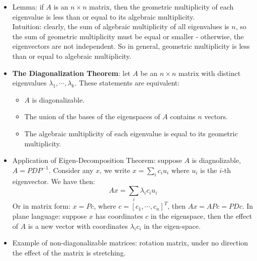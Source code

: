 \documentclass{report}
\begin{document}
\begin{itemize}
	\item Lemma: if $A$ is an $n \times n$ matrix, then the geometric multiplicity of each eigenvalue is less than or equal to its algebraic multiplicity. \\
	Intuition: clearly, the sum of algebraic multiplicity of all eigenvalues is $n$, so the sum of geometric multiplicity must be equal or smaller - otherwise, the eigenvectors are not independent. So in general, geometric multiplicity is less than or equal to algebraic multiplicity. 
	
	\item \textbf{The Diagonalization Theorem}: let $A$ be an $n \times n$ matrix with distinct eigenvalues $\lambda_1, \cdots, \lambda_k$. These statements are equivalent: 
	\begin{itemize}
		\item $A$ is diagonalizable. 
		\item The union of the bases of the eigenspaces of $A$ contains $n$ vectors. 
		\item The algebraic multiplicity of each eigenvalue is equal to its geometric multiplicity. 
	\end{itemize}
	 
	\item Application of Eigen-Decomposition Theorem: suppose $A$ is diagnolizable, $A = PDP^{-1}$. Consider any $x$, we write $x = \sum_i c_i u_i$ where $u_i$ is the $i$-th eigenvector. We have then: 
	\begin{equation}
	Ax = \sum_i \lambda_i c_i u_i
	\end{equation} 
	Or in matrix form: $x = Pc$, where $c = [c_1, \cdots, c_n]^T$, then $Ax = APc = PDc$. In plane language: suppose $x$ has coordinates $c$ in the eigenspace, then the effect of $A$ is a new vector with coordinates $\lambda_i c_i$ in the eigen-space. 
		 
	\item Example of non-diagonalizable matrices: rotation matrix, under no direction the effect of the matrix is stretching. 
	
\end{itemize}
	
\end{document}
